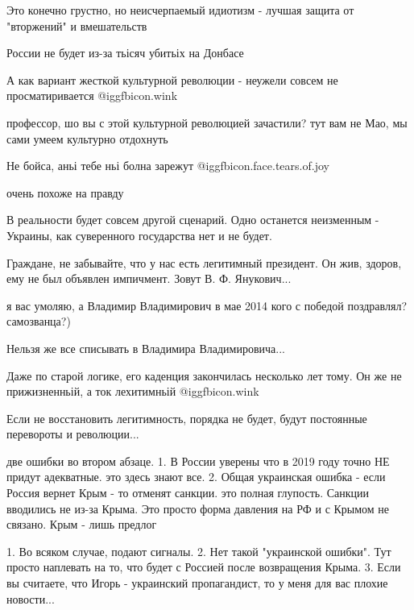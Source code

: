 \begin{itemize}
Это конечно грустно, но неисчерпаемый идиотизм - лучшая защита от "вторжений" и
вмешательств

России не будет из-за тьісяч убитьіх на Донбасе

А как вариант жесткой культурной революции - неужели совсем не просматиривается @igg{fbicon.wink} 

\begin{itemize} %
профессор, шо вы с этой культурной революцией зачастили? тут вам не Мао, мы сами умеем культурно отдохнуть

Не бойса, аньі тебе ньі болна зарежут @igg{fbicon.face.tears.of.joy} 
\end{itemize} %

очень похоже на правду

В реальности будет совсем другой сценарий. Одно останется неизменным - Украины, как суверенного государства нет и не будет.


Граждане, не забывайте, что у нас есть легитимный президент. Он жив, здоров,
ему не был объявлен импичмент. Зовут В. Ф. Янукович...

\begin{itemize} %
я вас умоляю, а Владимир Владимирович в мае 2014 кого с победой поздравлял? самозванца?)

Нельзя же все списывать в Владимира Владимировича...

Даже по старой логике, его каденция закончилась несколько лет тому. Он же не прижизненньій, а ток лехитимньій @igg{fbicon.wink} 

Если не восстановить легитимность, порядка не будет, будут постоянные перевороты и революции...
\end{itemize} %


две ошибки во втором абзаце. 1. В России уверены что в 2019 году точно НЕ
придут адекватные. это здесь знают все. 2. Общая украинская ошибка - если
Россия вернет Крым - то отменят санкции. это полная глупость. Санкции вводились
не из-за Крыма. Это просто форма давления на РФ и с Крымом не связано. Крым -
лишь предлог

\begin{itemize} %
1. Во всяком случае, подают сигналы. 2. Нет такой "украинской ошибки". Тут просто наплевать на то, что будет с Россией после возвращения Крыма. 3. Если вы считаете, что Игорь - украинский пропагандист, то у меня для вас плохие новости...


\end{itemize}
\end{itemize}

